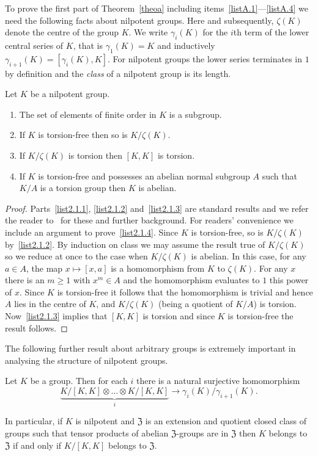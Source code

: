 To prove the first part of Theorem~\ref{theoa} including items~\eqref{listA.1}---\eqref{listA.4} we need the following facts about nilpotent groups. Here and subsequently, $\zeta(K)$ denote the centre of the group $K$. We write $\gamma_i(K)$ for the $i$th term of the lower central series of $K$, that is $\gamma_1(K)=K$ and inductively $\gamma_{i+1}(K)=[\gamma_i(K),K]$. For nilpotent groups the lower series terminates in $1$ by definition and the \emph{class} of a nilpotent group is its length.

\begin{lemm}\label{lem2.1}
Let $K$ be a nilpotent group.
\begin{enumerate}\romanenumi
\item \label{list2.1.1}The set of elements of finite order in $K$ is a subgroup.
\item \label{list2.1.2}If $K$ is torsion-free then so is $K/\zeta(K)$.
\item \label{list2.1.3}If $K/\zeta(K)$ is torsion then $[K,K]$ is torsion.
\item \label{list2.1.4}If $K$ is torsion-free and possesses an abelian normal subgroup $A$ such that $K/A$ is a torsion group then $K$ is abelian.
\end{enumerate}
\end{lemm}
\begin{proof}
Parts~\eqref{list2.1.1}, \eqref{list2.1.2} and~\eqref{list2.1.3} are standard results and we refer the reader to~\cite{Rob96} for these and further background. For readers' convenience we include an argument to prove~\eqref{list2.1.4}. Since $K$ is torsion-free, so is $K/\zeta(K)$ by~\eqref{list2.1.2}. By induction on class we may assume the result true of $K/\zeta(K)$ so we reduce at once to the case when $K/\zeta(K)$ is abelian. In this case, for any $a\in A$, the map $x\mapsto[x,a]$ is a homomorphism from $K$ to $\zeta(K)$. For any $x$ there is an $m\ge1$ with $x^m\in A$ and the homomorphism evaluates to $1$ this power of $x$. Since $K$ is torsion-free it follows that the homomorphism is trivial and hence $A$ lies in the centre of $K$, and $K/\zeta(K)$ (being a quotient of $K/A$) is torsion. Now~\eqref{list2.1.3} implies that $[K,K]$ is torsion and since $K$ is torsion-free the result follows.
\end{proof}

The following further result about arbitrary groups is extremely important in analysing the structure of nilpotent groups.

\begin{lemm}\label{lem2.2}
Let $K$ be a group. Then for each $i$ there is a natural surjective homomorphism
\[
\underbrace{K/[K,K]\otimes\dots\otimes K/[K,K]}_i\to
\gamma_i(K)/\gamma_{i+1}(K).
\]

In particular, if $K$ is nilpotent and $\mathfrak Z$ is an extension and quotient closed class of groups such that tensor products of abelian $\mathfrak Z$-groups are in $\mathfrak Z$ then $K$ belongs to $\mathfrak Z$ if and only if $K/[K,K]$ belongs to $\mathfrak Z$.
\end{lemm}

